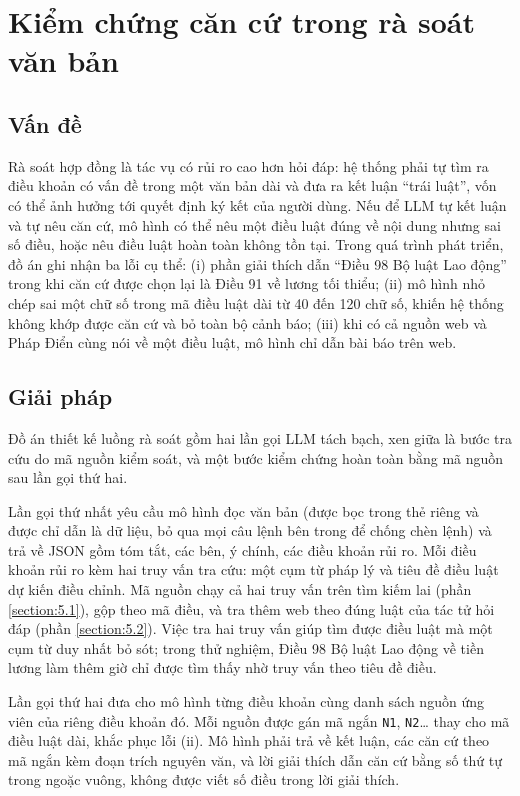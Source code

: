\documentclass[../DoAn.tex]{subfiles}
\begin{document}
\section{Kiểm chứng căn cứ trong rà soát văn bản}
\label{section:5.3}

\subsection{Vấn đề}
Rà soát hợp đồng là tác vụ có rủi ro cao hơn hỏi đáp: hệ thống phải tự tìm ra điều khoản có vấn đề trong một văn bản dài và đưa ra kết luận ``trái luật'', vốn có thể ảnh hưởng tới quyết định ký kết của người dùng. Nếu để LLM tự kết luận và tự nêu căn cứ, mô hình có thể nêu một điều luật đúng về nội dung nhưng sai số điều, hoặc nêu điều luật hoàn toàn không tồn tại. Trong quá trình phát triển, đồ án ghi nhận ba lỗi cụ thể: (i) phần giải thích dẫn ``Điều 98 Bộ luật Lao động'' trong khi căn cứ được chọn lại là Điều 91 về lương tối thiểu; (ii) mô hình nhỏ chép sai một chữ số trong mã điều luật dài từ 40 đến 120 chữ số, khiến hệ thống không khớp được căn cứ và bỏ toàn bộ cảnh báo; (iii) khi có cả nguồn web và Pháp Điển cùng nói về một điều luật, mô hình chỉ dẫn bài báo trên web.

\subsection{Giải pháp}
Đồ án thiết kế luồng rà soát gồm hai lần gọi LLM tách bạch, xen giữa là bước tra cứu do mã nguồn kiểm soát, và một bước kiểm chứng hoàn toàn bằng mã nguồn sau lần gọi thứ hai.

Lần gọi thứ nhất yêu cầu mô hình đọc văn bản (được bọc trong thẻ riêng và được chỉ dẫn là dữ liệu, bỏ qua mọi câu lệnh bên trong để chống chèn lệnh) và trả về JSON gồm tóm tắt, các bên, ý chính, các điều khoản rủi ro. Mỗi điều khoản rủi ro kèm hai truy vấn tra cứu: một cụm từ pháp lý và tiêu đề điều luật dự kiến điều chỉnh. Mã nguồn chạy cả hai truy vấn trên tìm kiếm lai (phần \ref{section:5.1}), gộp theo mã điều, và tra thêm web theo đúng luật của tác tử hỏi đáp (phần \ref{section:5.2}). Việc tra hai truy vấn giúp tìm được điều luật mà một cụm từ duy nhất bỏ sót; trong thử nghiệm, Điều 98 Bộ luật Lao động về tiền lương làm thêm giờ chỉ được tìm thấy nhờ truy vấn theo tiêu đề điều.

Lần gọi thứ hai đưa cho mô hình từng điều khoản cùng danh sách nguồn ứng viên của riêng điều khoản đó. Mỗi nguồn được gán mã ngắn \texttt{N1}, \texttt{N2}\ldots{} thay cho mã điều luật dài, khắc phục lỗi (ii). Mô hình phải trả về kết luận, các căn cứ theo mã ngắn kèm đoạn trích nguyên văn, và lời giải thích dẫn căn cứ bằng số thứ tự trong ngoặc vuông, không được viết số điều trong lời giải thích.
\end{document}
